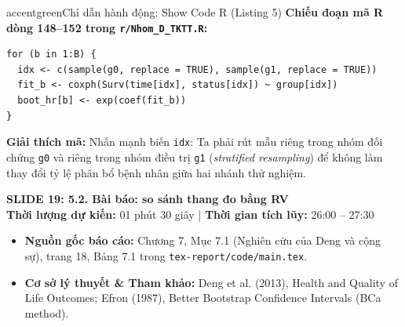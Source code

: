 \documentclass[10pt,a4paper]{article}
\newcommand{\slideheader}[4]{
    \vspace{0.4cm}
    \begin{tcolorbox}[colback=primary!7!white, colframe=primary, arc=2mm, boxrule=1pt, left=4mm, right=4mm, top=2.5mm, bottom=2.5mm]
        {\Large\bfseries\color{primary} SLIDE #1: #2}\\[0.1cm]
        {\small\textbf{Thời lượng dự kiến:} #3 \quad | \quad \textbf{Thời gian tích lũy:} #4}
    \end{tcolorbox}
    \vspace{0.15cm}
}
\begin{document}
\begin{actionbox}{accentgreen}{Chỉ dẫn hành động: Show Code R (Listing 5)}
    \textbf{Chiếu đoạn mã R dòng 148--152 trong \texttt{r/Nhom\_D\_TKTT.R}:}
\begin{verbatim}
for (b in 1:B) {
  idx <- c(sample(g0, replace = TRUE), sample(g1, replace = TRUE))
  fit_b <- coxph(Surv(time[idx], status[idx]) ~ group[idx])
  boot_hr[b] <- exp(coef(fit_b))
}
\end{verbatim}
    \textbf{Giải thích mã:} Nhấn mạnh biến \texttt{idx}: Ta phải rút mẫu riêng trong nhóm đối chứng \texttt{g0} và riêng trong nhóm điều trị \texttt{g1} (\textit{stratified resampling}) để không làm thay đổi tỷ lệ phân bổ bệnh nhân giữa hai nhánh thử nghiệm.
\end{actionbox}

\slideheader{19}{5.2. Bài báo: so sánh thang đo bằng RV}{01 phút 30 giây}{26:00 -- 27:30}

\begin{itemize}
    \item \textbf{Nguồn gốc báo cáo:} Chương 7, Mục 7.1 (Nghiên cứu của Deng và cộng sự), trang 18, Bảng 7.1 trong \texttt{tex-report/code/main.tex}.
    \item \textbf{Cơ sở lý thuyết \& Tham khảo:} Deng et al. (2013), Health and Quality of Life Outcomes; Efron (1987), Better Bootstrap Confidence Intervals (BCa method).
\end{itemize}
\end{document}
